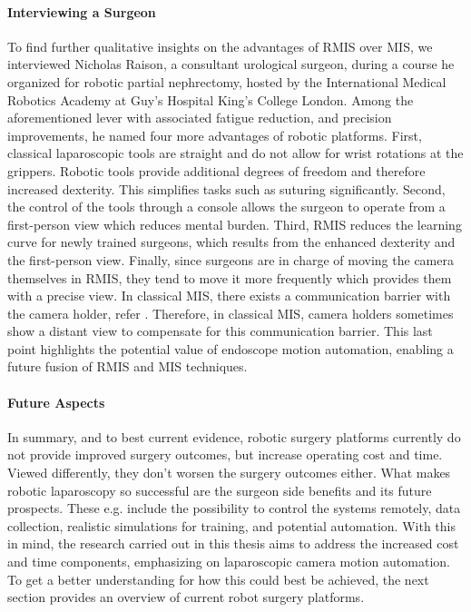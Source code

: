 \paragraph{Interviewing a Surgeon} To find further qualitative insights on the advantages of RMIS over MIS, we interviewed Nicholas Raison, a consultant urological surgeon, during a course he organized for robotic partial nephrectomy, hosted by the International Medical Robotics Academy at Guy's Hospital King's College London. Among the aforementioned lever with associated fatigue reduction, and precision improvements, he named four more advantages of robotic platforms. First, classical laparoscopic tools are straight and do not allow for wrist rotations at the grippers. Robotic tools provide additional degrees of freedom and therefore increased dexterity. This simplifies tasks such as suturing significantly. Second, the control of the tools through a console allows the surgeon to operate from a first-person view which reduces mental burden. Third, RMIS reduces the learning curve for newly trained surgeons, which results from the enhanced dexterity and the first-person view.
Finally, since surgeons are in charge of moving the camera themselves in RMIS, they tend to move it more frequently which provides them with a precise view. In classical MIS, there exists a communication barrier with the camera holder, refer . Therefore, in classical MIS, camera holders sometimes show a distant view to compensate for this communication barrier. This last point highlights the potential value of endoscope motion automation, enabling a future fusion of RMIS and MIS techniques. 

\paragraph{Future Aspects} In summary, and to best current evidence, robotic surgery platforms currently do not provide  improved surgery outcomes, but increase operating cost and time. Viewed differently, they don't worsen the surgery outcomes either. What makes robotic laparoscopy so successful are the surgeon side benefits and its future prospects. These e.g. include the possibility to control the systems remotely, data collection, realistic simulations for training, and potential automation. With this in mind, the research carried out in this thesis aims to address the increased cost and  time components, emphasizing on laparoscopic camera motion automation. To get a better understanding for how this could best be achieved, the next section provides an overview of current robot surgery platforms.

